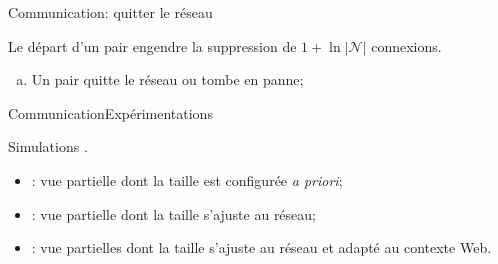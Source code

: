 \begin{frame}{Communication}{\SPRAY : quitter le réseau}

  Le départ d'un pair engendre la suppression de $1+\ln|\mathcal{N}|$ connexions.

  \vspace{0.5cm}

  \begin{minipage}{0.6\textwidth}
    \begin{enumerate}[(a)]
    \item Un pair quitte le réseau ou tombe en panne;
    \end{enumerate}
  \end{minipage}
  \hfill
  \begin{minipage}{0.37\textwidth}
    \begin{center}
      
    \end{center}
  \end{minipage}

  \vspace{1cm}
  \large
  \begin{itemize}
  \end{itemize}
 
\end{frame}


\begin{frame}{Communication}{Expérimentations}

  Simulations \PEERSIM.

  \vspace{0.5cm}

  \begin{itemize}
  \item \CYCLON : vue partielle dont la taille est configurée \textit{a priori};
  \item \SCAMP : vue partielle dont la taille s'ajuste au réseau;
  \item \SPRAY : vue partielles dont la taille s'ajuste au réseau et adapté au
    contexte Web.
  \end{itemize}

\end{frame}

